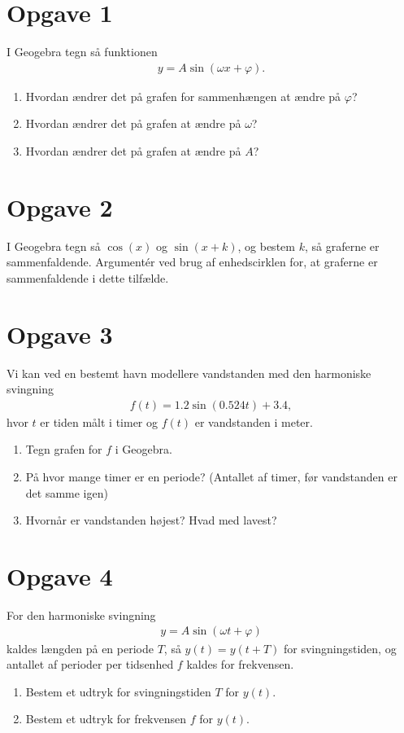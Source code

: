 \documentclass[12pt]{article}
\begin{document}
\section*{Opgave 1}
I Geogebra tegn så funktionen 
\begin{align*}
y = A\sin(\omega x + \varphi).
\end{align*}
\begin{enumerate}[label=\roman*)]
\item Hvordan ændrer det på grafen for sammenhængen at ændre på $\varphi$?
\item Hvordan ændrer det på grafen at ændre på $\omega$?
\item Hvordan ændrer det på grafen at ændre på $A$?
\end{enumerate}

\section*{Opgave 2}
I Geogebra tegn så $\cos(x)$ og $\sin(x+k)$, og bestem $k$, så graferne er sammenfaldende. Argumentér ved brug af enhedscirklen for, at graferne er sammenfaldende i dette tilfælde. 

\section*{Opgave 3}
Vi kan ved en bestemt havn modellere vandstanden med den harmoniske svingning
\begin{align*}
f(t) = 1.2\sin(0.524t) + 3.4,
\end{align*}
hvor $t$ er tiden målt i timer og $f(t)$ er vandstanden i meter. 
\begin{enumerate}[label=\roman*)]
\item Tegn grafen for $f$ i Geogebra. 
\item På hvor mange timer er en periode? (Antallet af timer, før vandstanden er det samme igen)
\item Hvornår er vandstanden højest? Hvad med lavest?
\end{enumerate}
\section*{Opgave 4}
For den harmoniske svingning 
\begin{align*}
y = A\sin(\omega t + \varphi)
\end{align*}
kaldes længden på en periode $T$, så $y(t) = y(t+T)$ for svingningstiden, og antallet af perioder per tidsenhed $f$ kaldes for frekvensen. 
\begin{enumerate}[label=\roman*)]
\item Bestem et udtryk for svingningstiden $T$ for $y(t)$.
\item Bestem et udtryk for frekvensen $f$ for $y(t)$.
\end{enumerate}
\end{document}
